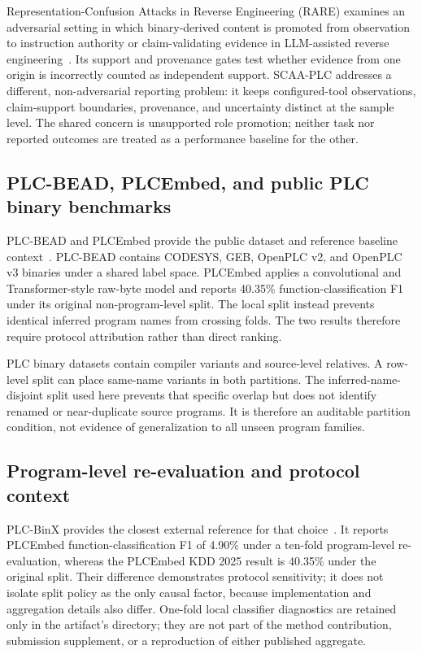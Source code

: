 \documentclass[a4paper,fleqn]{cas-dc}
\begin{document}
Representation-Confusion Attacks in Reverse Engineering (RARE) examines an adversarial setting in which binary-derived content is promoted from observation to instruction authority or claim-validating evidence in LLM-assisted reverse engineering~\citep{santos_grueiro_rare2026}. Its support and provenance gates test whether evidence from one origin is incorrectly counted as independent support. SCAA-PLC addresses a different, non-adversarial reporting problem: it keeps configured-tool observations, claim-support boundaries, provenance, and uncertainty distinct at the sample level. The shared concern is unsupported role promotion; neither task nor reported outcomes are treated as a performance baseline for the other.

\subsection{PLC-BEAD, PLCEmbed, and public PLC binary benchmarks}

PLC-BEAD and PLCEmbed provide the public dataset and reference baseline context~\citep{plcbead_plcembed_kdd2025,plcbead_plcembed_repo}. PLC-BEAD contains CODESYS, GEB, OpenPLC v2, and OpenPLC v3 binaries under a shared label space. PLCEmbed applies a convolutional and Transformer-style raw-byte model and reports 40.35\% function-classification F1 under its original non-program-level split. The local split instead prevents identical inferred program names from crossing folds. The two results therefore require protocol attribution rather than direct ranking.

PLC binary datasets contain compiler variants and source-level relatives. A row-level split can place same-name variants in both partitions. The inferred-name-disjoint split used here prevents that specific overlap but does not identify renamed or near-duplicate source programs. It is therefore an auditable partition condition, not evidence of generalization to all unseen program families.

\subsection{Program-level re-evaluation and protocol context}

PLC-BinX provides the closest external reference for that choice~\citep{plcbinx_arxiv2026}. It reports PLCEmbed function-classification F1 of 4.90\% under a ten-fold program-level re-evaluation, whereas the PLCEmbed KDD 2025 result is 40.35\% under the original split. Their difference demonstrates protocol sensitivity; it does not isolate split policy as the only causal factor, because implementation and aggregation details also differ. One-fold local classifier diagnostics are retained only in the artifact's  directory; they are not part of the method contribution, submission supplement, or a reproduction of either published aggregate.
\end{document}
